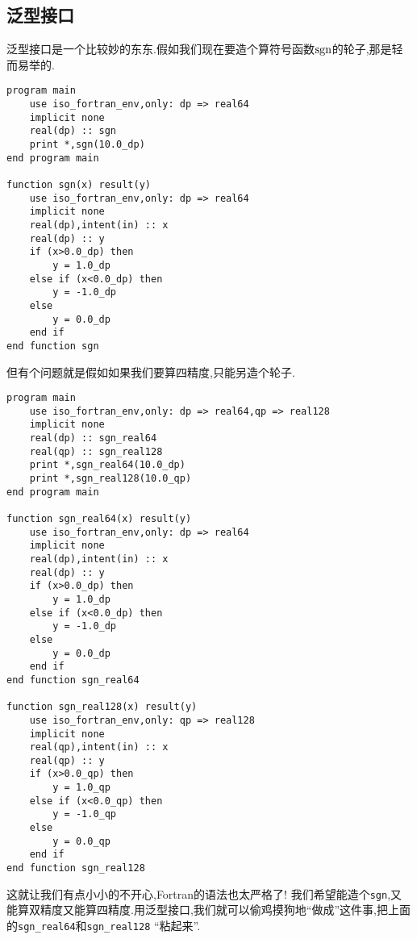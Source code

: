 \subsection{泛型接口}

泛型接口是一个比较妙的东东.假如我们现在要造个算符号函数$\operatorname{sgn}$的轮子,那是轻而易举的.
\begin{lstlisting}
program main
    use iso_fortran_env,only: dp => real64
    implicit none
    real(dp) :: sgn
    print *,sgn(10.0_dp)
end program main

function sgn(x) result(y)
    use iso_fortran_env,only: dp => real64
    implicit none
    real(dp),intent(in) :: x
    real(dp) :: y
    if (x>0.0_dp) then
        y = 1.0_dp
    else if (x<0.0_dp) then
        y = -1.0_dp
    else
        y = 0.0_dp
    end if
end function sgn
\end{lstlisting}
但有个问题就是假如如果我们要算四精度,只能另造个轮子.
\begin{lstlisting}
program main
    use iso_fortran_env,only: dp => real64,qp => real128
    implicit none
    real(dp) :: sgn_real64
    real(qp) :: sgn_real128
    print *,sgn_real64(10.0_dp)
    print *,sgn_real128(10.0_qp)
end program main

function sgn_real64(x) result(y)
    use iso_fortran_env,only: dp => real64
    implicit none
    real(dp),intent(in) :: x
    real(dp) :: y
    if (x>0.0_dp) then
        y = 1.0_dp
    else if (x<0.0_dp) then
        y = -1.0_dp
    else
        y = 0.0_dp
    end if
end function sgn_real64

function sgn_real128(x) result(y)
    use iso_fortran_env,only: qp => real128
    implicit none
    real(qp),intent(in) :: x
    real(qp) :: y
    if (x>0.0_qp) then
        y = 1.0_qp
    else if (x<0.0_qp) then
        y = -1.0_qp
    else
        y = 0.0_qp
    end if
end function sgn_real128
\end{lstlisting}
这就让我们有点小小的不开心,Fortran的语法也太严格了! 我们希望能造个\texttt{sgn},又能算双精度又能算四精度.用泛型接口,我们就可以偷鸡摸狗地``做成''这件事,把上面的\texttt{sgn\_{}real64}和\texttt{sgn\_{}real128} ``粘起来''.
